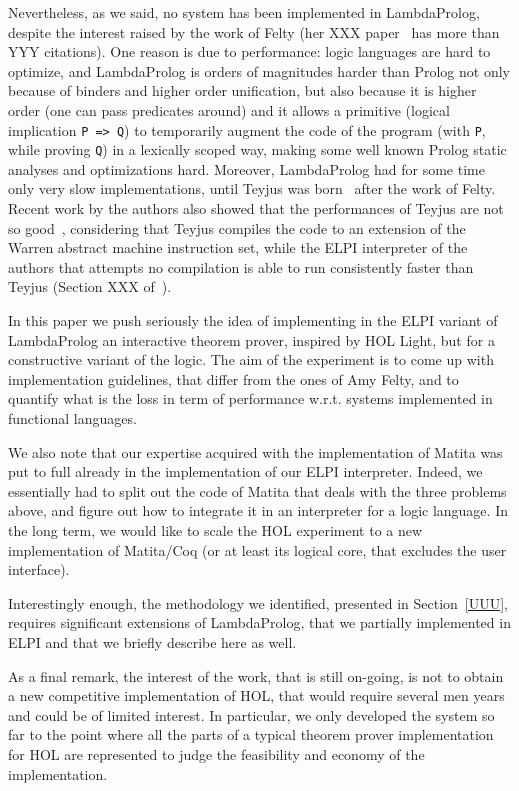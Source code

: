 \documentclass[preprint]{sigplanconf}
\begin{document}
Nevertheless, as we said, no system has been implemented in LambdaProlog, despite the interest raised by the work of Felty (her XXX paper~\cite{???} has more than YYY citations). One reason is due to performance: logic languages are hard to optimize, and LambdaProlog is orders of magnitudes harder than Prolog not only because of binders and higher order unification, but also because it is higher order (one can pass predicates around) and it allows a primitive (logical implication \texttt{P => Q}) to temporarily augment the code of the program (with \texttt{P}, while proving \texttt{Q}) in a lexically scoped way, making some well known Prolog static analyses and optimizations hard. Moreover, LambdaProlog had for some time only very slow implementations, until Teyjus was born~\cite{???} after the work of Felty. Recent work by the authors also showed that the performances of Teyjus are not so good~\cite{???}, considering that Teyjus compiles the code to an extension of the Warren abstract machine instruction set, while the ELPI interpreter of the authors that attempts no compilation is able to run consistently faster than Teyjus (Section XXX of~\cite{???}).

In this paper we push seriously the idea of implementing in the ELPI variant of LambdaProlog an interactive theorem prover, inspired by HOL Light, but for a constructive variant of the logic. The aim of the experiment is to come up with implementation guidelines, that differ from the ones of Amy Felty, and to quantify what is the loss in term of performance w.r.t. systems implemented in functional languages.

We also note that our expertise acquired with the implementation of Matita was put to full already in the implementation of our ELPI interpreter. Indeed, we essentially had to split out the code of Matita that deals with the three problems above, and figure out how to integrate it in an interpreter for a logic language. In the long term, we would like to scale the HOL experiment to a new implementation of Matita/Coq (or at least its logical core, that excludes the user interface).

Interestingly enough, the methodology we identified, presented in Section~\ref{UUU}, requires significant extensions of LambdaProlog, that we partially implemented in ELPI and that we briefly describe here as well.

As a final remark, the interest of the work, that is still on-going, is not to obtain a new competitive implementation of HOL, that would require several men years and could be of limited interest. In particular, we only developed the system so far to the point where all the parts of a typical theorem prover implementation for HOL are represented to judge the feasibility and economy of the implementation.
\end{document}
